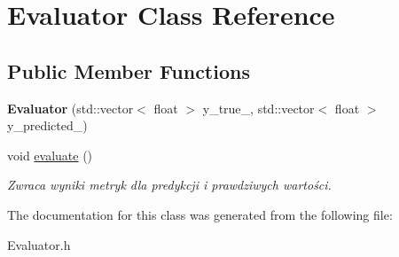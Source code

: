 \hypertarget{classEvaluator}{}\section{Evaluator Class Reference}
\label{classEvaluator}
\subsection*{Public Member Functions}
\begin{DoxyCompactItemize}
\item 
\mbox{\label{classEvaluator_aa7acf6f61bfb46810a5f5e2d9e61969a}} 
{\bfseries Evaluator} (std\+::vector$<$ float $>$ y\+\_\+true\+\_\+, std\+::vector$<$ float $>$ y\+\_\+predicted\+\_\+)
\item 
\mbox{\label{classEvaluator_aba0e1ef59383a51193e1a7bff4fcd7ee}} 
void \hyperlink{classEvaluator_aba0e1ef59383a51193e1a7bff4fcd7ee}{evaluate} ()
\begin{DoxyCompactList}\small\item\em Zwraca wyniki metryk dla predykcji i prawdziwych wartości. \end{DoxyCompactList}\end{DoxyCompactItemize}


The documentation for this class was generated from the following file\+:\begin{DoxyCompactItemize}
\item 
Evaluator.\+h\end{DoxyCompactItemize}
